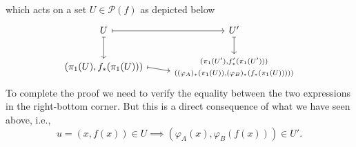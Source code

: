 which acts on a set $U\in\mathcal P(f)$ as depicted below
$$
    \begin{tikzcd}
        U
                \arrow[r,mapsto]
                \arrow[d,mapsto]
            &U'
                \arrow[d,mapsto]\\
        {(\pi_1(U),f_*(\pi_1(U)))}
                \arrow[r,mapsto,end anchor={[yshift=-4pt]west}]
            &\substack{(\pi_1(U'),f'_*(\pi_1(U')))
            \\\\
            ((\varphi_A)_*(\pi_1(U)),(\varphi_B)_*(f_*(\pi_1(U)))))}
    \end{tikzcd}
$$
To complete the proof we need to verify the equality between the two expressions in the right-bottom corner. But this is a direct consequence of what we have seen above, i.e.,
$$
    u=(x,f(x))\in U \implies (\varphi_A(x),\varphi_B(f(x)))\in U'.
$$